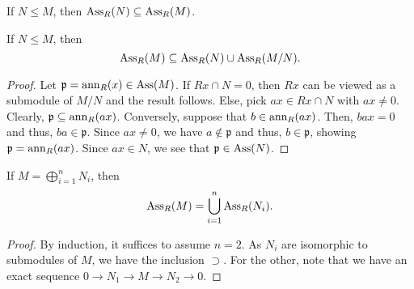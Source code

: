 \begin{cor} \label{cor:ass-of-submodule}
	If $N \le M$, then $\operatorname{Ass}_{R}(N) \subseteq \operatorname{Ass}_{R}(M)$.
\end{cor}

\begin{prop}
	If $N \le M$, then
	\begin{equation*} 
		\operatorname{Ass}_{R}(M) \subseteq \operatorname{Ass}_{R}(N) \cup \operatorname{Ass}_{R}(M/N).
	\end{equation*}
\end{prop}
\begin{proof} 
	Let $\mathfrak{p} = \operatorname{ann}_{R}(x) \in \operatorname{Ass}(M)$. If $Rx \cap N = 0$, then $Rx$ can be viewed as a submodule of $M/N$ and the result follows. Else, pick $ax \in Rx \cap N$ with $ax \neq 0$. Clearly, $\mathfrak{p} \subseteq \operatorname{ann}_{R}(ax)$. Conversely, suppose that $b \in \operatorname{ann}_{R}(ax)$. Then, $bax = 0$ and thus, $ba \in \mathfrak{p}$. Since $ax \neq 0$, we have $a \notin \mathfrak{p}$ and thus, $b \in \mathfrak{p}$, showing $\mathfrak{p} = \operatorname{ann}_{R}(ax)$. Since $ax \in N$, we see that $\mathfrak{p} \in \operatorname{Ass}(N)$.
\end{proof}

\begin{cor}
	If $M = \bigoplus_{i = 1}^{n} N_{i}$, then 
	\begin{equation*} 
		\operatorname{Ass}_{R}(M) = \bigcup_{i = 1}^{n} \operatorname{Ass}_{R}(N_{i}).
	\end{equation*}
\end{cor}
\begin{proof} 
	By induction, it suffices to assume $n = 2$. As $N_{i}$ are isomorphic to submodules of $M$, we have the inclusion $\supset$. For the other, note that we have an exact sequence $0 \to N_{1} \to M \to N_{2} \to 0$.
\end{proof}


